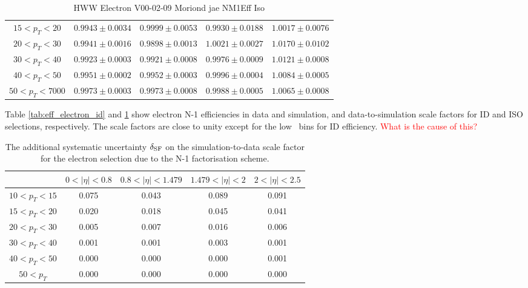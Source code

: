 \begin{table}[!htp]
\begin{center}
\begin{tabular}{c|c|c|c|c}
$ 15 < p_T <  20$ & $0.9943 \pm 0.0034$ & $0.9999 \pm 0.0053$ & $0.9930 \pm 0.0188$ & $1.0017 \pm 0.0076$  \\
$ 20 < p_T <  30$ & $0.9941 \pm 0.0016$ & $0.9898 \pm 0.0013$ & $1.0021 \pm 0.0027$ & $1.0170 \pm 0.0102$  \\
$ 30 < p_T <  40$ & $0.9923 \pm 0.0003$ & $0.9921 \pm 0.0008$ & $0.9976 \pm 0.0009$ & $1.0121 \pm 0.0008$  \\
$ 40 < p_T <  50$ & $0.9951 \pm 0.0002$ & $0.9952 \pm 0.0003$ & $0.9996 \pm 0.0004$ & $1.0084 \pm 0.0005$  \\
$ 50 < p_T < 7000$ & $0.9973 \pm 0.0003$ & $0.9973 \pm 0.0008$ & $0.9988 \pm 0.0005$ & $1.0065 \pm 0.0008$  \\
\end{tabular}
\caption{HWW Electron V00-02-09 Moriond jae NM1Eff Iso}
\label{tab:eff_electron_iso}
\end{center}
\end{table}


Table \ref{tab:eff_electron_id} and \ref{tab:eff_electron_iso} show electron N-1 efficiencies in 
data and simulation, and data-to-simulation scale factors for ID and ISO selections, respectively. 
The scale factors are close to unity except for the low \pt~bins for ID efficiency. 
\textcolor{red}{What is the cause of this?}

%
\begin{table}[!htp]
\begin{center}
\begin{tabular}{c|c|c|c|c}
\hline & $0 < |\eta| < 0.8$ & $0.8 < |\eta| < 1.479$ & $1.479 < |\eta| < 2$ & $2 < |\eta| < 2.5$  \\
\hline
$ 10 < p_T <  15$ &    0.075  &     0.043  &     0.089  &     0.091  \\
$ 15 < p_T <  20$ &    0.020  &     0.018  &     0.045  &     0.041  \\
$ 20 < p_T <  30$ &    0.005  &     0.007  &     0.016  &     0.006  \\
$ 30 < p_T <  40$ &    0.001  &     0.001  &     0.003  &     0.001  \\
$ 40 < p_T <  50$ &    0.000  &     0.000  &     0.000  &     0.001  \\
$ 50 < p_T $ &   0.000  &     0.000  &     0.000  &     0.000  \\
\hline
\end{tabular}
\caption{The additional systematic uncertainty $\delta_{\rm{SF}}$ on the simulation-to-data scale factor 
for the electron selection due to the N-1 factorisation scheme.}
\label{tab:eff_electron_nmsyst}
\end{center}
\end{table}

